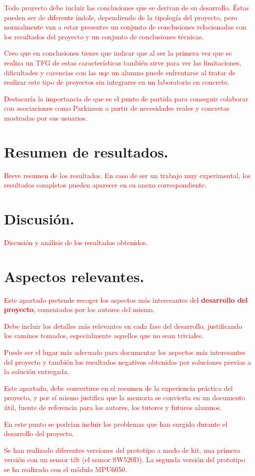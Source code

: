 \textcolor{red}{Todo proyecto debe incluir las conclusiones que se derivan de su desarrollo. Éstas pueden ser de diferente índole, dependiendo de la tipología del proyecto, pero normalmente van a estar presentes un conjunto de conclusiones relacionadas con los resultados del proyecto y un conjunto de conclusiones técnicas. }

\textcolor{red}{Creo que en conclusiones tienes que indicar que al ser la primera vez que se realiza un TFG de estas características también sirve para ver las limitaciones, dificultades y carencias con las uqe un alumno puede enfrentarse al tratar de realizar este tipo de proyectos sin integrarse en un laboratorio en concreto. }

\textcolor{red}{Destacaría la importancia de que es el punto de partida para conseguir colaborar con asociaciones como Parkinson a partir de necesidades reales y concretas mostradas por sus usuarios.}

\section{Resumen de resultados.}

\textcolor{red}{Breve resumen de los resultados. En caso de ser un trabajo muy experimental, los resultados completos pueden aparecer en su anexo correspondiente.}

\section{Discusión.}
\textcolor{red}{Discusión y análisis de los resultados obtenidos.}


\section{Aspectos relevantes.}
\textcolor{red}{
Este apartado pretende recoger los aspectos más interesantes del \textbf{desarrollo del proyecto}, comentados por los autores del mismo.}

\textcolor{red}{Debe incluir los detalles más relevantes en cada fase del desarrollo, justificando los caminos tomados, especialmente aquellos que no sean triviales. }

\textcolor{red}{Puede ser el lugar más adecuado para documentar los aspectos más interesantes del proyecto y también los resultados negativos obtenidos por soluciones previas a la solución entregada.}

\textcolor{red}{Este apartado, debe convertirse en el resumen de la experiencia práctica del proyecto, y por sí mismo justifica que la memoria se convierta en un documento útil, fuente de referencia para los autores, los tutores y futuros alumnos.}

\textcolor{red}{En este punto se podrían incluir los problemas que han surgido durante el desarrollo del proyecto.}

\textcolor{red}{Se han realizado diferentes versiones del prototipo a modo de kit, una primera versión con un sensor tilt (el sensor SW520D). }
\textcolor{red}{La segunda versión del prototipo se ha realizado con el módulo MPU6050.}




